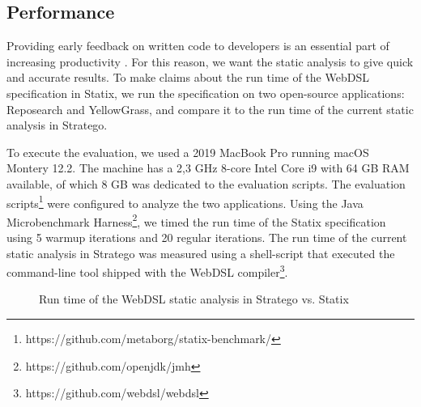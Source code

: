   \subsection{Performance}

    Providing early feedback on written code to developers is an essential part of increasing productivity \autocite{Becker2019}. For this reason, we want the static analysis to give quick and accurate results. To make claims about the run time of the WebDSL specification in Statix, we run the specification on two open-source applications: Reposearch and YellowGrass, and compare it to the run time of the current static analysis in Stratego.

    To execute the evaluation, we used a 2019 MacBook Pro running macOS Montery 12.2. The machine has a 2,3 GHz 8-core Intel Core i9 with 64 GB RAM available, of which 8 GB was dedicated to the evaluation scripts. The evaluation scripts\footnote{https://github.com/metaborg/statix-benchmark/} were configured to analyze the two applications. Using the Java Microbenchmark Harness\footnote{https://github.com/openjdk/jmh}, we timed the run time of the Statix specification using 5 warmup iterations and 20 regular iterations. The run time of the current static analysis in Stratego was measured using a shell-script that executed the command-line tool shipped with the WebDSL compiler\footnote{https://github.com/webdsl/webdsl}.

    \begin{figure}
      \analysisbenchmarkresults
      \caption{\label{fig:analysis-performance-charts}Run time of the WebDSL static analysis in Stratego vs. Statix}
    \end{figure}

